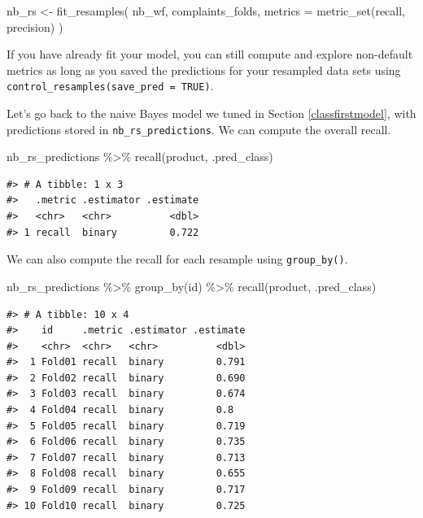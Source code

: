 \documentclass[
]{krantz}
\makeatletter
\newenvironment{Shaded}{\begin{snugshade}}{\end{snugshade}}
\newcommand{\AttributeTok}[1]{\textcolor[rgb]{0.77,0.63,0.00}{#1}}
\newcommand{\FunctionTok}[1]{\textcolor[rgb]{0.00,0.00,0.00}{#1}}
\newcommand{\NormalTok}[1]{#1}
\newcommand{\OtherTok}[1]{\textcolor[rgb]{0.56,0.35,0.01}{#1}}
\newcommand{\SpecialCharTok}[1]{\textcolor[rgb]{0.00,0.00,0.00}{#1}}
\newenvironment{kframe}{%
\medskip{}
\setlength{\fboxsep}{.8em}
 \def\at@end@of@kframe{}%
 \ifinner\ifhmode%
  \def\at@end@of@kframe{\end{minipage}}%
  \begin{minipage}{\columnwidth}%
 \fi\fi%
 \def\FrameCommand##1{\hskip\@totalleftmargin \hskip-\fboxsep
 \colorbox{shadecolor}{##1}\hskip-\fboxsep
     \hskip-\linewidth \hskip-\@totalleftmargin \hskip\columnwidth}%
 \MakeFramed {\advance\hsize-\width
   \@totalleftmargin\z@ \linewidth\hsize
   \@setminipage}}%
 {\par\unskip\endMakeFramed%
 \at@end@of@kframe}
\renewenvironment{Shaded}{\begin{kframe}}{\end{kframe}}
\makeatother
\begin{document}
\begin{Shaded}
\begin{Highlighting}[]
\NormalTok{nb\_rs }\OtherTok{\textless{}{-}} \FunctionTok{fit\_resamples}\NormalTok{(}
\NormalTok{  nb\_wf,}
\NormalTok{  complaints\_folds,}
  \AttributeTok{metrics =} \FunctionTok{metric\_set}\NormalTok{(recall, precision)}
\NormalTok{)}
\end{Highlighting}
\end{Shaded}

If you have already fit your model, you can still compute and explore non-default metrics as long as you saved the predictions for your resampled data sets using \texttt{control\_resamples(save\_pred\ =\ TRUE)}.

Let's go back to the naive Bayes model we tuned in Section \ref{classfirstmodel}, with predictions stored in \texttt{nb\_rs\_predictions}. We can compute the overall recall.

\begin{Shaded}
\begin{Highlighting}[]
\NormalTok{nb\_rs\_predictions }\SpecialCharTok{\%\textgreater{}\%}
  \FunctionTok{recall}\NormalTok{(product, .pred\_class)}
\end{Highlighting}
\end{Shaded}

\begin{verbatim}
#> # A tibble: 1 x 3
#>   .metric .estimator .estimate
#>   <chr>   <chr>          <dbl>
#> 1 recall  binary         0.722
\end{verbatim}

We can also compute the recall for each resample using \texttt{group\_by()}.

\begin{Shaded}
\begin{Highlighting}[]
\NormalTok{nb\_rs\_predictions }\SpecialCharTok{\%\textgreater{}\%}
  \FunctionTok{group\_by}\NormalTok{(id) }\SpecialCharTok{\%\textgreater{}\%}
  \FunctionTok{recall}\NormalTok{(product, .pred\_class)}
\end{Highlighting}
\end{Shaded}

\begin{verbatim}
#> # A tibble: 10 x 4
#>    id     .metric .estimator .estimate
#>    <chr>  <chr>   <chr>          <dbl>
#>  1 Fold01 recall  binary         0.791
#>  2 Fold02 recall  binary         0.690
#>  3 Fold03 recall  binary         0.674
#>  4 Fold04 recall  binary         0.8  
#>  5 Fold05 recall  binary         0.719
#>  6 Fold06 recall  binary         0.735
#>  7 Fold07 recall  binary         0.713
#>  8 Fold08 recall  binary         0.655
#>  9 Fold09 recall  binary         0.717
#> 10 Fold10 recall  binary         0.725
\end{verbatim}
\end{document}
